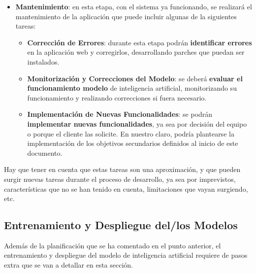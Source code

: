 \begin{itemize}
	\item \textbf{Mantenimiento}: en esta etapa, con el sistema ya funcionando, se realizará el mantenimiento de la aplicación que puede incluir algunas de la siguientes tareas:
	\begin{itemize}
		\item \textbf{Corrección de Errores}: durante esta etapa podrán \textbf{identificar errores} en la aplicación web y corregirlos, desarrollando parches que puedan ser instalados.
		\item \textbf{Monitorización y Correcciones del Modelo}: se deberá \textbf{evaluar el funcionamiento modelo} de inteligencia artificial, monitorizando su funcionamiento y realizando correcciones si fuera necesario.
		\item \textbf{Implementación de Nuevas Funcionalidades}: se podrán \textbf{implementar nuevas funcionalidades}, ya sea por decisión del equipo o porque el cliente las solicite. En nuestro claro, podría plantearse la implementación de los objetivos secundarios definidos al inicio de este documento.
	\end{itemize}
\end{itemize}    

Hay que tener en cuenta que estas tareas son una aproximación, y que pueden surgir nuevas tareas durante el proceso de desarrollo, ya sea por imprevistos, características que no se han tenido en cuenta, limitaciones que vayan surgiendo, etc.

\subsection{Entrenamiento y Despliegue del/los Modelos}
Además de la planificación que se ha comentado en el punto anterior, el entrenamiento y despliegue del modelo de inteligencia artificial requiere de pasos extra que se van a detallar en esta sección. 

